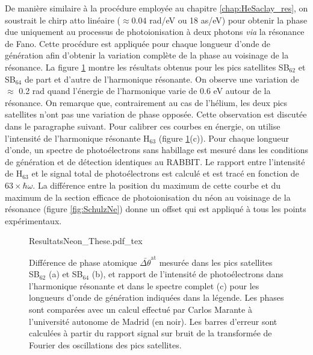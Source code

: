 De manière similaire à la procédure employée au chapitre \ref{chap:HeSaclay_res}, on soustrait le chirp atto linéaire ($\approx 0.04$ rad/eV ou 18 as/eV) pour obtenir la phase due uniquement au processus de photoionisation à deux photons \textit{via} la résonance de Fano. Cette procédure est appliquée pour chaque longueur d'onde de génération afin d'obtenir la variation complète de la phase au voisinage de la résonance. La figure \ref{fig:ResultatsNe} montre les résultats obtenus pour les pics satellites SB$_{62}$ et SB$_{64}$ de part et d'autre de l'harmonique résonante. On observe une variation de $\approx$ 0.2 rad quand l'énergie de l'harmonique varie de 0.6 eV autour de la résonance. On remarque que, contrairement au cas de l'hélium, les deux pics satellites n'ont pas une variation de phase opposée. Cette observation est discutée dans le paragraphe suivant. Pour calibrer ces courbes en énergie, on utilise l'intensité de l'harmonique résonante H$_{63}$ (figure \ref{fig:ResultatsNe}(c)). Pour chaque longueur d'onde, un spectre de photoélectrons sans habillage est mesuré dans les conditions de génération et de détection identiques au RABBIT. Le rapport entre l'intensité de H$_{63}$ et le signal total de photoélectrons est calculé et est tracé en fonction de $63 \times \hbar \omega$. La différence entre la position du maximum de cette courbe et du maximum de la section efficace de photoionisation du néon au voisinage de la résonance (figure \ref{fig:SchulzNe}) donne un offset qui est appliqué à tous les points expérimentaux.

\begin{figure}
\centering
\def\svgwidth{\textwidth}
{ResultatsNeon_These.pdf_tex}
\caption{Différence de phase atomique $\bar{\Delta \theta}^{\text{at}}$ mesurée dans les pics satellites SB$_{62}$ (a) et SB$_{64}$ (b), et rapport de l'intensité de photoélectrons dans l'harmonique résonante et dans le spectre complet (c) pour les longueurs d'onde de génération indiquées dans la légende. Les phases sont comparées avec un calcul effectué par Carlos Marante à l'université autonome de Madrid (en noir). Les barres d'erreur sont calculées à partir du rapport signal sur bruit de la transformée de Fourier des oscillations des pics satellites.}
\label{fig:ResultatsNe}
\end{figure}


